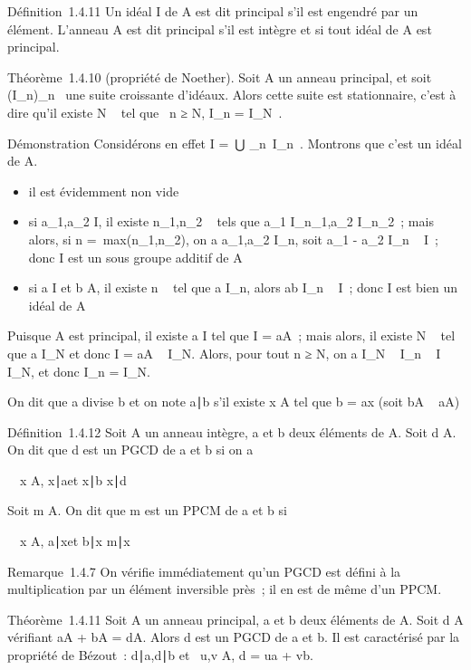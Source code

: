 Définition~1.4.11 Un idéal I de A est dit principal s'il est engendré
par un élément. L'anneau A est dit principal s'il est intègre et si tout
idéal de A est principal.

Théorème~1.4.10 (propriété de Noether). Soit A un anneau principal, et
soit (I_n)_n\in{}~ une suite croissante d'idéaux. Alors
cette suite est stationnaire, c'est à dire qu'il existe N \in {}~ tel que
\forall~n ≥ N, I_n = I_N~.

Démonstration Considérons en effet I =\
⋃  _n\in{}~I_n~. Montrons que
c'est un idéal de A.

\begin{itemize}
\itemsep1pt\parskip0pt
\item
  il est évidemment non vide
\item
  si a_1,a_2 \in I, il existe n_1,n_2
  \in {}~ tels que a_1 \in I_n_1,a_2 \in
  I_n_2~; mais alors, si n =\
  max(n_1,n_2), on a a_1,a_2 \in
  I_n, soit a_1 - a_2 \in I_n \subset~ I~;
  donc I est un sous groupe additif de A
\item
  si a \in I et b \in A, il existe n \in {}~ tel que a \in I_n, alors ab
  \in I_n \subset~ I~; donc I est bien un idéal de A
\end{itemize}

Puisque A est principal, il existe a \in I tel que I = aA~; mais alors, il
existe N \in {}~ tel que a \in I_N et donc I = aA \subset~ I_N.
Alors, pour tout n ≥ N, on a I_N \subset~ I_n \subset~ I \subset~
I_N, et donc I_n = I_N.

On dit que a divise b et on note a∣b s'il
existe x \in A tel que b = ax (soit bA \subset~ aA)

Définition~1.4.12 Soit A un anneau intègre, a et b deux éléments de A.
Soit d \in A. On dit que d est un PGCD de a et b si on a

\forall~~x \in A,\quad
x∣a\text et
x∣b \mathrel\Leftrightarrow
x∣d

Soit m \in A. On dit que m est un PPCM de a et b si

\forall~~x \in A,\quad
a∣x\text et
b∣x \mathrel\Leftrightarrow
m∣x

Remarque~1.4.7 On vérifie immédiatement qu'un PGCD est défini à la
multiplication par un élément inversible près~; il en est de même d'un
PPCM.

Théorème~1.4.11 Soit A un anneau principal, a et b deux éléments de A.
Soit d \in A vérifiant aA + bA = dA. Alors d est un PGCD de a et b. Il est
caractérisé par la propriété de Bézout~:
d∣a,d\mathrel∣b et
\exists~u,v \in A, d = ua + vb.

